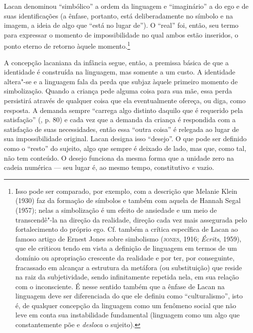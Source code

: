 Lacan denominou ``simbólico'' a ordem da linguagem e ``imaginário'' a do
ego e de suas identificações (a ênfase, portanto, está deliberadamente
no símbolo e na imagem, a ideia de algo que ``está no lugar de''). O
``real'' foi, então, seu termo para expressar o momento de
impossibilidade no qual ambos estão inseridos, o ponto eterno de retorno
àquele momento.\footnote{Isso pode ser comparado, por exemplo, com a
  descrição que Melanie Klein (1930) faz da formação de símbolos
  e também com aquela de Hannah Segal (1957); nelas a simbolização é um
  efeito de ansiedade e um meio de transcendê"-la na direção da
  realidade, direção cada vez mais assegurada pelo fortalecimento do
  próprio ego. Cf. também a crítica específica de Lacan ao famoso artigo
  de Ernest Jones sobre simbolismo (\textsc{jones}, 1916; \emph{Écrits}, 1959),
  que ele criticou tendo em vista a definição de linguagem em termos de
  um domínio ou apropriação crescente da realidade e por ter, por
  conseguinte, fracassado em alcançar a estrutura da metáfora (ou
  substituição) que reside na raiz da subjetividade, sendo infinitamente
  repetida nela, em sua relação com o inconsciente. É nesse sentido
  também que a ênfase de Lacan na linguagem deve ser diferenciada do que
  ele definiu como ``culturalismo'', isto é, de qualquer concepção da
  linguagem como um fenômeno social que não leve em conta sua
  instabilidade fundamental (linguagem como um algo que constantemente
  põe e \emph{desloca} o sujeito).}

A concepção lacaniana da infância segue, então, a premissa básica de que
a identidade é construída na linguagem, mas somente a um custo. A
identidade altera"-se e a linguagem fala da perda que subjaz àquele
primeiro momento de simbolização. Quando a criança pede alguma coisa
para sua mãe, essa perda persistirá através de qualquer coisa que ela
eventualmente ofereça, ou diga, como resposta. A demanda sempre
``carrega algo distinto daquilo que é requerido pela satisfação'' (,
p. 80) e cada vez que a demanda da criança é respondida com a satisfação
de suas necessidades, então essa ``outra coisa'' é relegada ao lugar de
sua impossibilidade original. Lacan designa isso ``desejo''. O que pode
ser definido como o ``resto'' do sujeito, algo que sempre é deixado de
lado, mas que, como tal, não tem conteúdo. O desejo funciona da mesma
forma que a unidade zero na cadeia numérica --- seu lugar é, ao mesmo
tempo, constitutivo \emph{e} vazio.

